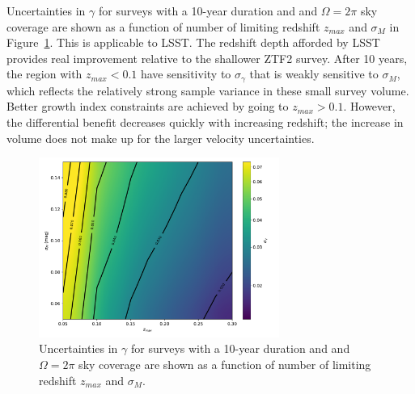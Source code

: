 \documentclass[11pt, oneside]{article}   	%
\begin{document}
Uncertainties in $\gamma$ for surveys with a 10-year duration and  and $\Omega=2\pi$ sky coverage 
are shown as a function of number of limiting  redshift $z_{max}$ and $\sigma_M$ in Figure~\ref{lsst:fig}.
This is applicable to LSST.
The redshift depth afforded by LSST provides real improvement relative to the shallower ZTF2 survey.
After 10 years, the region with $z_{max}<0.1$ have sensitivity to  $\sigma_\gamma$ that is weakly sensitive to $\sigma_M$, 
which reflects the relatively strong sample variance in these small survey volume.  Better growth index constraints
are achieved by going to $z_{max}>0.1$.  However, the differential benefit decreases quickly with increasing redshift;
the increase in volume does not make up for the larger velocity uncertainties.

\begin{figure}
\centering
\includegraphics[width=0.7\textwidth]{src/surface2.pdf}
\caption{Uncertainties in $\gamma$ for surveys with a 10-year duration and  and $\Omega=2\pi$ sky coverage 
are shown as a function of number of limiting  redshift $z_{max}$ and $\sigma_M$.
\label{lsst:fig}}
\end{figure}
\end{document}
